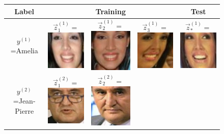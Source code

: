 \begin{figure}
\centering
\begin{tabular}{|c|ccc|c|}
\hline
Label & & Training & & Test\\ \hline
$y^{(1)}$=Amelia & 
  $\vec{z}_1^{(1)} = $\includegraphics[scale = 0.2]{../../proposal/face_photos/Amelia_Vega_0001.png} &  
  $\vec{z}_2^{(1)} = $\includegraphics[scale = 0.2]{../../proposal/face_photos/Amelia_Vega_0002.png} &  
  $\vec{z}_3^{(1)} = $\includegraphics[scale = 0.2]{../../proposal/face_photos/Amelia_Vega_0003.png} &  
  $\vec{z}_*^{(1)} = $\includegraphics[scale = 0.2]{../../proposal/face_photos/Amelia_Vega_0004.png} \\ \hline
$y^{(2)}$=Jean-Pierre & 
  $\vec{z}_1^{(2)} = $\includegraphics[scale = 0.2]{../../proposal/face_photos/Jean-Pierre_Raffarin_0001.png} &  
  $\vec{z}_2^{(2)} = $\includegraphics[scale = 0.2]{../../proposal/face_photos/Jean-Pierre_Raffarin_0002.png} &  

\end{tabular}
\end{figure}
